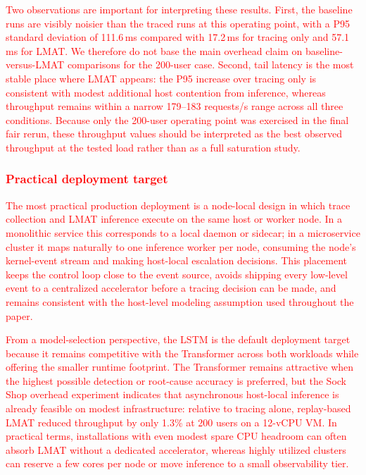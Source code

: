 \documentclass[preprint,12pt]{elsarticle}
\begin{document}
\textcolor{red}{Two observations are important for interpreting these results. First, the baseline runs are visibly noisier than the traced runs at this operating point, with a P95 standard deviation of 111.6\,ms compared with 17.2\,ms for tracing only and 57.1\,ms for LMAT. We therefore do not base the main overhead claim on baseline-versus-LMAT comparisons for the 200-user case. Second, tail latency is the most stable place where LMAT appears: the P95 increase over tracing only is consistent with modest additional host contention from inference, whereas throughput remains within a narrow 179--183 requests/s range across all three conditions. Because only the 200-user operating point was exercised in the final fair rerun, these throughput values should be interpreted as the best observed throughput at the tested load rather than as a full saturation study.}

\subsubsection{\textcolor{red}{Practical deployment target}}
\textcolor{red}{The most practical production deployment is a node-local design in which trace collection and LMAT inference execute on the same host or worker node. In a monolithic service this corresponds to a local daemon or sidecar; in a microservice cluster it maps naturally to one inference worker per node, consuming the node's kernel-event stream and making host-local escalation decisions. This placement keeps the control loop close to the event source, avoids shipping every low-level event to a centralized accelerator before a tracing decision can be made, and remains consistent with the host-level modeling assumption used throughout the paper.}

\textcolor{red}{From a model-selection perspective, the LSTM is the default deployment target because it remains competitive with the Transformer across both workloads while offering the smaller runtime footprint. The Transformer remains attractive when the highest possible detection or root-cause accuracy is preferred, but the Sock Shop overhead experiment indicates that asynchronous host-local inference is already feasible on modest infrastructure: relative to tracing alone, replay-based LMAT reduced throughput by only 1.3\% at 200 users on a 12-vCPU VM. In practical terms, installations with even modest spare CPU headroom can often absorb LMAT without a dedicated accelerator, whereas highly utilized clusters can reserve a few cores per node or move inference to a small observability tier.}
\end{document}
